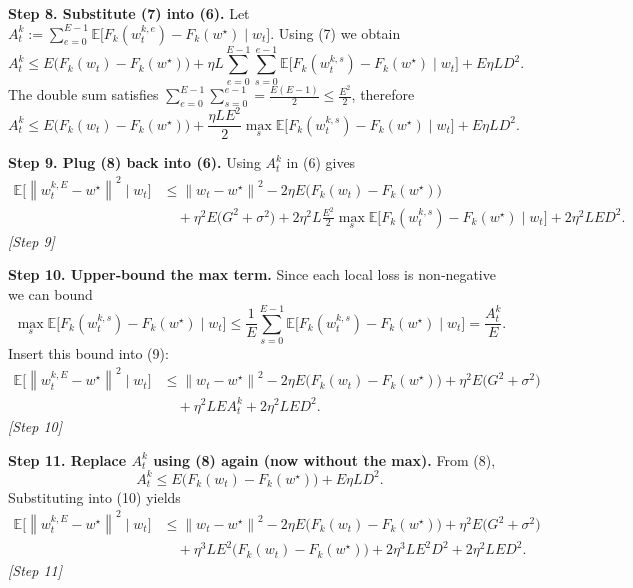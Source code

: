 \documentclass{article}
\newcommand{\EE}{\mathbb{E}}
\newcommand{\norm}[1]{\left\lVert#1\right\rVert}
\begin{document}
\bigskip
\noindent\textbf{Step 8. Substitute (7) into (6).}  
Let $A_{t}^{k}:=\sum_{e=0}^{E-1}\EE\!\bigl[F_k(w_{t}^{k,e})-F_k(w^\star)\mid w_t\bigr]$.
Using (7) we obtain
\[
A_{t}^{k}\le E\bigl(F_k(w_t)-F_k(w^\star)\bigr) 
      + \eta L\sum_{e=0}^{E-1}\sum_{s=0}^{e-1}\EE\!\bigl[F_k(w_{t}^{k,s})-F_k(w^\star)\mid w_t\bigr]
      + E\eta L D^2 .
\]
The double sum satisfies $\sum_{e=0}^{E-1}\sum_{s=0}^{e-1} = \frac{E(E-1)}{2}\le \frac{E^2}{2}$, therefore
\[
A_{t}^{k}\le E\bigl(F_k(w_t)-F_k(w^\star)\bigr)
          + \frac{\eta L E^2}{2}\max_{s}\EE\!\bigl[F_k(w_{t}^{k,s})-F_k(w^\star)\mid w_t\bigr]
          + E\eta L D^2 . \tag{8}
\]

\bigskip
\noindent\textbf{Step 9. Plug (8) back into (6).}  
Using $A_{t}^{k}$ in (6) gives
\begin{align}
\EE\!\bigl[\norm{w_{t}^{k,E}-w^\star}^2\mid w_t\bigr]
&\le \norm{w_t-w^\star}^2
 -2\eta E\bigl(F_k(w_t)-F_k(w^\star)\bigr) \nonumber\\
&\quad +\eta^2E\bigl(G^2+\sigma^2\bigr)
 + 2\eta^2 L\frac{E^2}{2}\max_{s}\EE\!\bigl[F_k(w_{t}^{k,s})-F_k(w^\star)\mid w_t\bigr]
 + 2\eta^2 L E D^2 . \tag{9}
\end{align}
\textit{[Step 9]}

\bigskip
\noindent\textbf{Step 10. Upper‑bound the max term.}  
Since each local loss is non‑negative we can bound
\[
\max_{s}\EE\!\bigl[F_k(w_{t}^{k,s})-F_k(w^\star)\mid w_t\bigr]\le
\frac{1}{E}\sum_{s=0}^{E-1}\EE\!\bigl[F_k(w_{t}^{k,s})-F_k(w^\star)\mid w_t\bigr]
 =\frac{A_{t}^{k}}{E}.
\]
Insert this bound into (9):
\begin{align}
\EE\!\bigl[\norm{w_{t}^{k,E}-w^\star}^2\mid w_t\bigr]
&\le \norm{w_t-w^\star}^2
 -2\eta E\bigl(F_k(w_t)-F_k(w^\star)\bigr)
 +\eta^2E\bigl(G^2+\sigma^2\bigr) \nonumber\\
&\quad + \eta^2 L E A_{t}^{k}+ 2\eta^2 L E D^2 . \tag{10}
\end{align}
\textit{[Step 10]}

\bigskip
\noindent\textbf{Step 11. Replace $A_{t}^{k}$ using (8) again (now without the max).}  
From (8),
\[
A_{t}^{k}\le E\bigl(F_k(w_t)-F_k(w^\star)\bigr)+E\eta L D^2 .
\]
Substituting into (10) yields
\begin{align}
\EE\!\bigl[\norm{w_{t}^{k,E}-w^\star}^2\mid w_t\bigr]
&\le \norm{w_t-w^\star}^2
 -2\eta E\bigl(F_k(w_t)-F_k(w^\star)\bigr)
 +\eta^2E\bigl(G^2+\sigma^2\bigr) \nonumber\\
&\quad + \eta^3 L E^2\bigl(F_k(w_t)-F_k(w^\star)\bigr)
 + 2\eta^3 L E^2 D^2 + 2\eta^2 L E D^2 . \tag{11}
\end{align}
\textit{[Step 11]}
\end{document}
